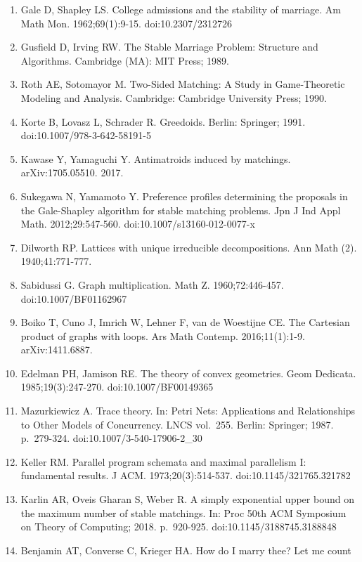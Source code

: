 \documentclass[
  11pt,
]{article}
\providecommand{\tightlist}{%
  \setlength{\itemsep}{0pt}\setlength{\parskip}{0pt}}
\begin{document}
\begin{enumerate}
\def\labelenumi{\arabic{enumi}.}
\tightlist
\item
  Gale D, Shapley LS. College admissions and the stability of marriage.
  Am Math Mon. 1962;69(1):9-15. doi:10.2307/2312726
\item
  Gusfield D, Irving RW. The Stable Marriage Problem: Structure and
  Algorithms. Cambridge (MA): MIT Press; 1989.
\item
  Roth AE, Sotomayor M. Two-Sided Matching: A Study in Game-Theoretic
  Modeling and Analysis. Cambridge: Cambridge University Press; 1990.
\item
  Korte B, Lovasz L, Schrader R. Greedoids. Berlin: Springer; 1991.
  doi:10.1007/978-3-642-58191-5
\item
  Kawase Y, Yamaguchi Y. Antimatroids induced by matchings.
  arXiv:1705.05510. 2017.
\item
  Sukegawa N, Yamamoto Y. Preference profiles determining the proposals
  in the Gale-Shapley algorithm for stable matching problems. Jpn J Ind
  Appl Math. 2012;29:547-560. doi:10.1007/s13160-012-0077-x
\item
  Dilworth RP. Lattices with unique irreducible decompositions. Ann Math
  (2). 1940;41:771-777.
\item
  Sabidussi G. Graph multiplication. Math Z. 1960;72:446-457.
  doi:10.1007/BF01162967
\item
  Boiko T, Cuno J, Imrich W, Lehner F, van de Woestijne CE. The
  Cartesian product of graphs with loops. Ars Math Contemp.
  2016;11(1):1-9. arXiv:1411.6887.
\item
  Edelman PH, Jamison RE. The theory of convex geometries. Geom
  Dedicata. 1985;19(3):247-270. doi:10.1007/BF00149365
\item
  Mazurkiewicz A. Trace theory. In: Petri Nets: Applications and
  Relationships to Other Models of Concurrency. LNCS vol.~255. Berlin:
  Springer; 1987. p.~279-324. doi:10.1007/3-540-17906-2\_30
\item
  Keller RM. Parallel program schemata and maximal parallelism I:
  fundamental results. J ACM. 1973;20(3):514-537.
  doi:10.1145/321765.321782
\item
  Karlin AR, Oveis Gharan S, Weber R. A simply exponential upper bound
  on the maximum number of stable matchings. In: Proc 50th ACM Symposium
  on Theory of Computing; 2018. p.~920-925. doi:10.1145/3188745.3188848
\item
  Benjamin AT, Converse C, Krieger HA. How do I marry thee? Let me count

\end{enumerate}
\end{document}
